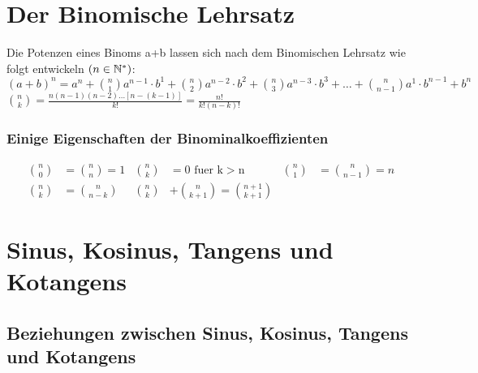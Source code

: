 	\vspace{10mm}
	\section{Der Binomische Lehrsatz}
	
			
		Die Potenzen eines Binoms a+b lassen sich nach dem Binomischen Lehrsatz 
		\newline 
		wie folgt entwickeln \( \left(n \in \mathbb{N}^* \right)\):
		\vspace{5mm}
		\newline
		\( \left( a + b \right)^n = a^n + \binom{n}{1} a^{n-1} \cdot b^1 + \binom{n}{2} a^{n-2} \cdot b^2 + \binom{n}{3} a^{n-3} \cdot b^3 + 
		\ldots + \binom{n}{n-1} a^{1} \cdot b^{n-1} + b^n \)
		\vspace{5mm}
		\newline
		\vspace{5mm}
		\newline
		\( \binom{n}{k} = \frac{n \left( n - 1 \right) \left( n - 2 \right) \ldots \left[ n - \left( k - 1 \right) \right]}{k!} = \frac{n!}{k! \left( n - k \right) !} \)
	
	\vspace{10mm}
	\subsubsection{Einige Eigenschaften der Binominalkoeffizienten}
		
		
			\begin{align*}
				\binom{n}{0} &= \binom{n}{n} = 1 & \binom{n}{k} &= 0 \text{ fuer k} > \text{n} & \binom{n}{1} &= \binom{n}{n-1} = n
				\\
				\binom{n}{k} &= \binom{n}{n-k} & \binom{n}{k} &+ \binom{n}{k+1} = \binom{n+1}{k+1}
			\end{align*}
			
	\vspace{10mm}
	\section{Sinus, Kosinus, Tangens und Kotangens}
	
	\vspace{10mm}
	\subsection{Beziehungen zwischen Sinus, Kosinus, Tangens und Kotangens}
	
